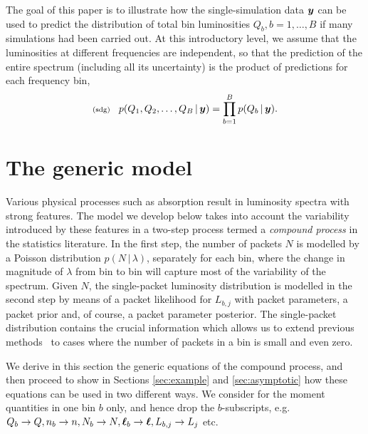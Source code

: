 \documentclass[11pt]{article}
\newcommand{\lleq}[1]{\label{#1} }
\renewcommand{\lleq}[1]{\label{#1} {\scriptstyle {\rm (#1)}} \hspace*{2ex} }
\newcommand{\cond}{\,|\,}
\newcommand{\Lum}{L}
\begin{document}
The goal of this paper is to illustrate how the single-simulation data
${\bm{y}}$ can be used to predict the distribution of total bin
luminosities $Q_b, b = 1,\ldots,B$ if many simulations had been
carried out. At this introductory level, we assume that the
luminosities at different frequencies are independent, so that the
prediction of the entire spectrum (including all its uncertainty) is
the product of predictions for each frequency bin,
\begin{align}
  \lleq{sdg}
  p(Q_1,Q_2,\ldots,Q_B\cond\bmy) = \prod_{b=1}^B p(Q_b\cond \bmy).
\end{align}

\section{The generic model} \label{sec:model}

Various physical processes such as absorption result in luminosity
spectra with strong features. The model we develop below takes into
account the variability introduced by these features in a two-step
process termed a \textit{compound process} in the statistics
literature.
%
In the first step, the number of packets $N$ is modelled by a Poisson
distribution $p(N\cond\lambda)$, separately for each bin, where the
change in magnitude of $\lambda$ from bin to bin will capture most of
the variability of the spectrum. Given $N$, the single-packet
luminosity distribution is modelled in the second step by means of a
packet likelihood for $\Lum_{b,j}$ with packet parameters, a packet
prior and, of course, a packet parameter posterior. The single-packet
distribution contains the crucial information which allows us to
extend previous
methods~\cite{bohm_comparison_2012,bohm_statistics_2014} to cases
where the number of packets in a bin is small and even zero.

We derive in this section the generic equations of the compound
process, and then proceed to show in Sections \ref{sec:example} and
\ref{sec:asymptotic} how these equations can be used in two different
ways.
%
We consider for the moment quantities in one bin $b$ only, and hence
drop the $b$-subscripts, e.g.\
$Q_b \to Q, n_b \to n, N_b\to N, {\bm{\ell}}_b\to{\bm{\ell}}, L_{b,j} \to L_j$ etc.
\end{document}
